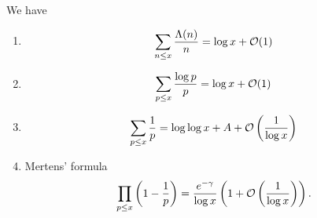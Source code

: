 \documentclass[twoside, openright, fontsize=10pt, headings=big]{scrbook}
\begin{document}
\begin{theorem}{}{}
    We have
    \begin{enumerate}
        \item[(1)] 
        \[
            \sum_{n\leq x}\frac{\Lambda(n)}{n}=\log x+\mathcal{O}(1)
        \]
        \item[(2)]
        \[
            \sum_{p\leq x}\frac{\log p}{p}=\log x+\mathcal{O}(1)
        \]
        \item[(3)]
        \[
            \sum_{p\leq x}\frac{1}{p}=\log\log x+A+\mathcal{O}\left(\frac{1}{\log x}\right)
        \]
        \item[(4)] Mertens' formula
        \[
            \prod_{p\leq x}\left(1-\frac{1}{p}\right)=\frac{e^{-\gamma}}{\log x}\left(1+\mathcal{O}\left(\frac{1}{\log x}\right)\right).
        \]
    \end{enumerate}
\end{theorem}
\end{document}
